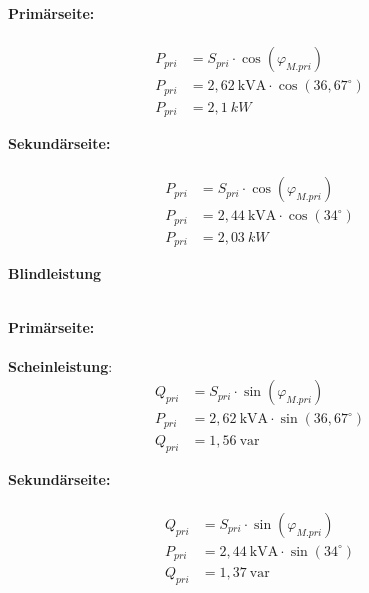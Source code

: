 \begin{enumerate}[label=\alph*)]
\begin{tcolorbox}[colback=gray!30,
			      colframe=black,
			      width=0.9\textwidth,
		      ]
{			      \begin{minipage}{0.5\textwidth}
				      \textbf{Primärseite:}\\ \ \\
				      \begin{align*}
					      P_{pri} & = S_{pri} \cdot \cos(\varphi_{M.pri})      \\
					      P_{pri} & = 2,62\ \text{kVA} \cdot \cos(36,67^\circ) \\
					      P_{pri} & = 2,1\ kW
				      \end{align*}
			      \end{minipage}\hfill
			      \begin{minipage}{0.5\textwidth}
				      \textbf{Sekundärseite:}\\ \ \\
				      \begin{align*}
					      P_{pri} & = S_{pri} \cdot \cos(\varphi_{M.pri})   \\
					      P_{pri} & = 2,44\ \text{kVA} \cdot \cos(34^\circ) \\
					      P_{pri} & = 2,03\ kW
				      \end{align*}
			      \end{minipage}
		      }
	      \end{tcolorbox}

	      \textbf{Blindleistung}\\ \ \\
	      \begin{tcolorbox}[colback=gray!30,
			      colframe=black,
			      width=0.9\textwidth,
		      ]
		      \parbox{\textwidth}{

			      \begin{minipage}{0.5\textwidth}
				      \textbf{Primärseite:}\\ \ \\
				      \textbf{Scheinleistung}:
				      \begin{align*}
					      Q_{pri} & = S_{pri} \cdot \sin(\varphi_{M.pri})      \\
					      P_{pri} & = 2,62\ \text{kVA} \cdot \sin(36,67^\circ) \\
					      Q_{pri} & = 1,56\ \text{var}
				      \end{align*}
			      \end{minipage}\hfill
			      \begin{minipage}{0.5\textwidth}
				      \textbf{Sekundärseite:}\\ \ \\
				      \begin{align*}
					      Q_{pri} & = S_{pri} \cdot \sin(\varphi_{M.pri})   \\
					      P_{pri} & = 2,44\ \text{kVA} \cdot \sin(34^\circ) \\
					      Q_{pri} & = 1,37\ \text{var}
				      \end{align*}
			      \end{minipage}
		      }
	      \end{tcolorbox}


\end{enumerate}
